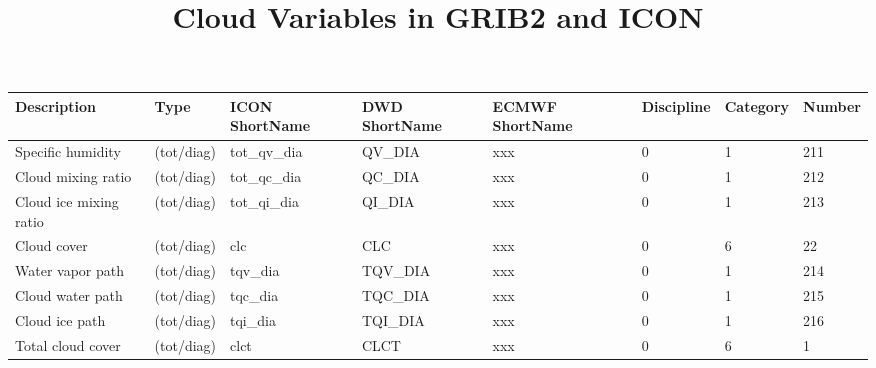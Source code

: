 \documentclass[a4paper,11pt,landscape,notitlepage]{article}
\title{Cloud Variables in GRIB2 and ICON}
\begin{document}
  
\maketitle
\addtolength{\voffset}{-2cm}
\addtolength{\hoffset}{-1cm}
\addtolength{\textwidth}{+2cm}
\addtolength{\textheight}{+2cm}


\hspace{-6cm}
\begin{centering}
\begin{tabular}{l l l l l l l l}  

\textbf{Description}   & \textbf{Type} & \textbf{ICON ShortName} & \textbf{DWD ShortName} & \textbf{ECMWF ShortName} & \textbf{Discipline} & \textbf{Category} & \textbf{Number} \\
\hline
Specific humidity      &  (tot/diag)   &  tot\_qv\_dia           &  QV\_DIA               &  xxx                     &  0                  &     1             &        211 \\
Cloud mixing ratio     &  (tot/diag)   &  tot\_qc\_dia           &  QC\_DIA               &  xxx                     &  0                  &     1             &        212 \\
Cloud ice mixing ratio &  (tot/diag)   &  tot\_qi\_dia           &  QI\_DIA               &  xxx                     &  0                  &     1             &        213 \\
Cloud cover            &  (tot/diag)   &  clc                    &  CLC                   &  xxx                     &  0                  &     6             &        22  \\
Water vapor path       &  (tot/diag)   &  tqv\_dia               &  TQV\_DIA              &  xxx                     &  0                  &     1             &        214 \\
Cloud water path       &  (tot/diag)   &  tqc\_dia               &  TQC\_DIA              &  xxx                     &  0                  &     1             &        215 \\
Cloud ice path         &  (tot/diag)   &  tqi\_dia               &  TQI\_DIA              &  xxx                     &  0                  &     1             &        216 \\
Total cloud cover      &  (tot/diag)   &  clct                   &  CLCT                  &  xxx                     &  0                  &     6             &        1   \\

\end{tabular}
\end{centering}
\end{document}
